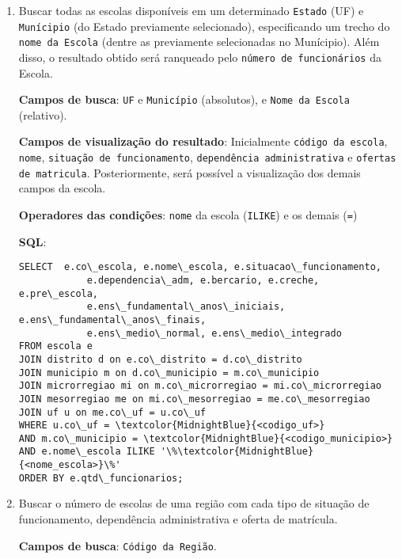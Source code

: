 \documentclass[12pt,a4paper]{article}
\begin{document}
\begin{enumerate}
    \item 
        Buscar todas as escolas disponíveis em um determinado \texttt{Estado} (UF) e \texttt{Munícipio} (do Estado previamente selecionado), especificando um trecho do \texttt{nome da Escola} (dentre as previamente selecionadas no Munícipio). Além disso, o resultado obtido será ranqueado pelo \texttt{número de funcionários} da Escola.
        
        \textbf{Campos de busca}: \texttt{UF} e \texttt{Município} (absolutos), e \texttt{Nome da Escola} (relativo). 
        
        \textbf{Campos de visualização do resultado}: Inicialmente \texttt{código da escola}, \texttt{nome}, \texttt{situação de funcionamento}, \texttt{dependência administrativa} e  \texttt{ofertas de matricula}. Posteriormente, será possível a visualização dos demais campos da escola.
    
        \textbf{Operadores das condições}: \texttt{nome} da escola (\texttt{ILIKE}) e os demais (\texttt{=})
        
        \textbf{SQL}:
        \begin{Verbatim}[commandchars=\\\{\}]
SELECT  e.co\_escola, e.nome\_escola, e.situacao\_funcionamento,
            e.dependencia\_adm, e.bercario, e.creche, e.pre\_escola,
            e.ens\_fundamental\_anos\_iniciais, e.ens\_fundamental\_anos\_finais,
            e.ens\_medio\_normal, e.ens\_medio\_integrado
FROM escola e
JOIN distrito d on e.co\_distrito = d.co\_distrito
JOIN municipio m on d.co\_municipio = m.co\_municipio
JOIN microrregiao mi on m.co\_microrregiao = mi.co\_microrregiao
JOIN mesorregiao me on mi.co\_mesorregiao = me.co\_mesorregiao
JOIN uf u on me.co\_uf = u.co\_uf
WHERE u.co\_uf = \textcolor{MidnightBlue}{<codigo_uf>}
AND m.co\_municipio = \textcolor{MidnightBlue}{<codigo_municipio>}
AND e.nome\_escola ILIKE '\%\textcolor{MidnightBlue}{<nome_escola>}\%'
ORDER BY e.qtd\_funcionarios;
        \end{Verbatim}
    
    \vspace{0.5cm}
    \item 
        Buscar o número de escolas de uma região com cada tipo de situação de funcionamento, dependência administrativa e oferta de matrícula.
        
        \textbf{Campos de busca}: \texttt{Código da Região}.
        

\end{enumerate}
\end{document}
